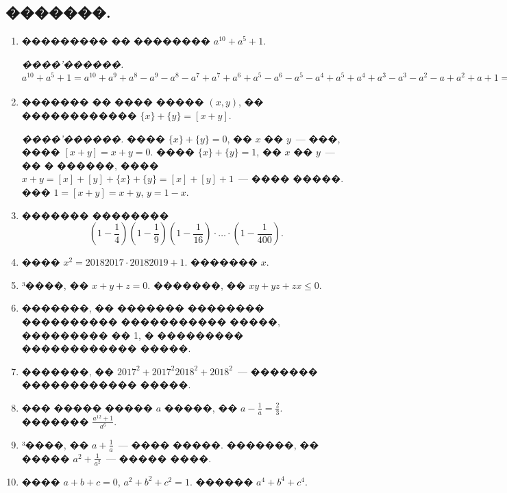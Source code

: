\documentclass[a4paper,12pt]{article}
\begin{document}
\newpage

\begin{center}
\section*{�������.}
\end{center}

\medskip\medskip\medskip

\begin{enumerate}
\item ��������� �� ��������
$a^{10}+a^{5}+1$.

\textit{����'������.} $a^{10}+a^{5}+1 = a^{10}+a^{9}+a^{8}-a^{9}-a^{8}-a^{7}+a^{7}+a^{6}+a^{5}-a^{6}-a^{5}-a^{4}+a^{5}+a^{4}+a^{3} -a^{3}-a^{2}-a+a^{2}+a+1=(a^{2}+a+1)(a^{8}-a^{7}+a^{5}-a^{4}+a^{2}-a+1)$

\item ������� �� ���� ����� $(x,y)$, �� ������������ $\{x\}+\{y\}=[x+y]$.

\textit{����'������.} ���� $\{x\}+\{y\}=0$, �� $x$ �� $y$~--- ���, ���� $[x+y]=x+y=0$.
���� $\{x\}+\{y\}=1$, �� $x$ �� $y$~--- �� � ������, ���� $x+y= [x]+[y]+ \{x\}+\{y\}=[x]+[y]+ 1$~--- ���� �����. ��� $1=[x+y]=x+y$, $y=1-x$.



\item ������� �������� $$(1-\frac{1}{4})(1-\frac{1}{9})(1-\frac{1}{16})\cdot\ldots\cdot(1-\frac{1}{400}).$$

\item ���� $x^{2}=20182017\cdot20182019+1$. ������� $x$.

\item ³����, �� $x+y+z=0$. �������, �� $xy+yz+zx\leq 0$.

\item �������, �� ������� �������� ���������� ����������� �����, ��������� �� 1, � ��������� ������������ �����.

\item �������, �� $2017^{2}+2017^{2}2018^{2}+2018^{2}$~--- ������� ������������ �����.

\item ��� ����� ����� $a$ �����, �� $a-\frac{1}{a}=\frac{2}{3}$. ������� $\frac{a^{12}+1}{a^{6}}$.

\item ³����, �� $a+\frac{1}{a}$~--- ���� �����. �������, �� ����� $a^{2}+\frac{1}{a^2}$~--- ����� ����.

\item ���� $a+b+c=0$, $a^{2}+b^{2}+c^{2}=1$. ������ $a^{4}+b^{4}+c^{4}$.


\end{enumerate}
\end{document}
